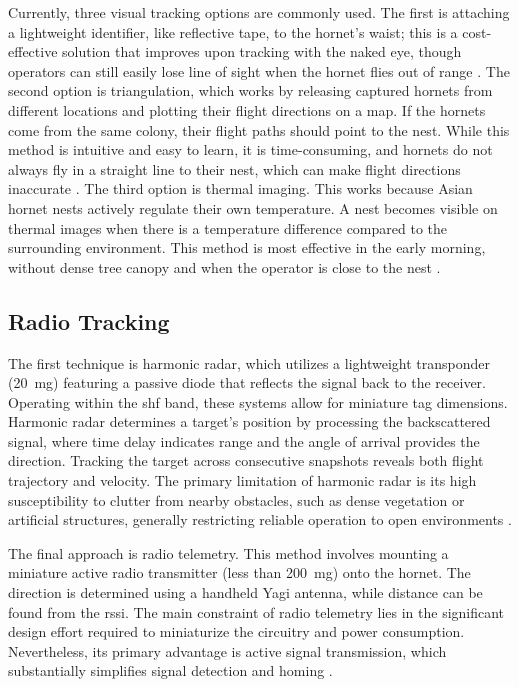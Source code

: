 Currently, three visual tracking options are commonly used. The first is attaching a lightweight identifier, like reflective tape, to the hornet's waist; this is a cost-effective solution that improves upon tracking with the naked eye, though operators can still easily lose line of sight when the hornet flies out of range \cite{wangReviewFiveExisting2024}. The second option is triangulation, which works by releasing captured hornets from different locations and plotting their flight directions on a map. If the hornets come from the same colony, their flight paths should point to the nest. While this method is intuitive and easy to learn, it is time-consuming, and hornets do not always fly in a straight line to their nest, which can make flight directions inaccurate \cite{wangReviewFiveExisting2024}. The third option is thermal imaging. This works because Asian hornet nests actively regulate their own temperature. A nest becomes visible on thermal images when there is a temperature difference compared to the surrounding environment. This method is most effective in the early morning, without dense tree canopy and when the operator is close to the nest \cite{ViabilityThermalImaging}.

\subsection{Radio Tracking}

The first technique is harmonic radar, which utilizes a lightweight transponder (20~mg) featuring a passive diode that reflects the signal back to the receiver. Operating within the \gls{shf} band, these systems allow for miniature tag dimensions. Harmonic radar determines a target's position by processing the backscattered signal, where time delay indicates range and the angle of arrival provides the direction. Tracking the target across consecutive snapshots reveals both flight trajectory and velocity. The primary limitation of harmonic radar is its high susceptibility to clutter from nearby obstacles, such as dense vegetation or artificial structures, generally restricting reliable operation to open environments \cite{wangReviewFiveExisting2024}.

The final approach is radio telemetry. This method involves mounting a miniature active radio transmitter (less than 200~mg) onto the hornet. The direction is determined using a handheld Yagi antenna, while distance can be found from the \gls{rssi}. The main constraint of radio telemetry lies in the significant design effort required to miniaturize the circuitry and power consumption. Nevertheless, its primary advantage is active signal transmission, which substantially simplifies signal detection and homing \cite{wangReviewFiveExisting2024}.

